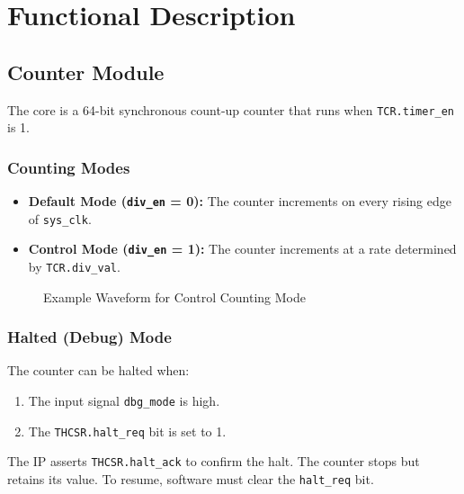 \documentclass[11pt, a4paper]{article}
\begin{document}
\section{Functional Description}

\subsection{Counter Module}
The core is a 64-bit synchronous count-up counter that runs when \texttt{TCR.timer\_en} is 1.

\subsubsection{Counting Modes}
\begin{itemize}
    \item \textbf{Default Mode (\texttt{div\_en} = 0):} The counter increments on every rising edge of \texttt{sys\_clk}.
    \item \textbf{Control Mode (\texttt{div\_en} = 1):} The counter increments at a rate determined by \texttt{TCR.div\_val}.
\end{itemize}

\begin{figure}[H]
    \centering
    \caption{Example Waveform for Control Counting Mode}
    \label{fig:counting_waveform}
\end{figure}

\subsubsection{Halted (Debug) Mode}
The counter can be halted when:
\begin{enumerate}
    \item The input signal \texttt{dbg\_mode} is high.
    \item The \texttt{THCSR.halt\_req} bit is set to 1.
\end{enumerate}
The IP asserts \texttt{THCSR.halt\_ack} to confirm the halt. The counter stops but retains its value. To resume, software must clear the \texttt{halt\_req} bit.
\end{document}
